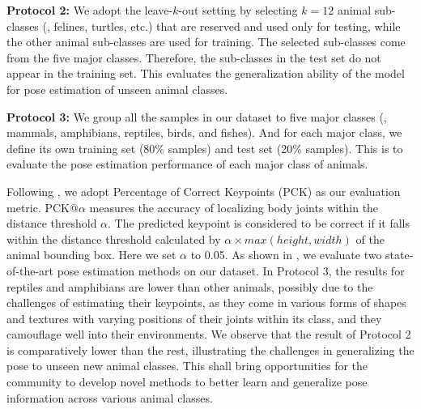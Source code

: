 \documentclass[10pt,twocolumn,letterpaper]{article}
\begin{document}
    \textbf{Protocol 2:} We adopt the leave-$k$-out setting by selecting $k=12$ animal sub-classes (\eg, felines, turtles, etc.) that are reserved and used only for testing, while the other animal sub-classes are used for training. The selected sub-classes come from the five major classes. Therefore, the sub-classes in the test set do not appear in the training set. This evaluates the generalization ability of the model for pose estimation of unseen animal classes.
    
    \textbf{Protocol 3:} We group all the samples in our dataset to five major classes (\ie, mammals, amphibians, reptiles, birds, and fishes). And for each major class, we define its own training set (80\% samples) and test set (20\% samples). This is to evaluate the pose estimation performance of each major class of animals. 
    
    Following \cite{yang2012articulated}, we adopt Percentage of Correct Keypoints (PCK) as our evaluation metric. PCK@$\alpha$ measures the accuracy of localizing body joints within the distance threshold $\alpha$. The predicted keypoint is considered to be correct if it falls within the distance threshold calculated by \begin{math} \alpha \times max(height, width) \end{math} of the animal bounding box. Here we set $\alpha$ to 0.05. As shown in , we evaluate two state-of-the-art pose estimation methods \cite{SunXLW19,Zhang_2020_CVPR} on our dataset.
    In Protocol 3, the results for reptiles and amphibians are lower than other animals, possibly due to the challenges of estimating their keypoints, as they come in various forms of shapes and textures with varying positions of their joints within its class, and they camouflage well into their environments. We observe that the result of Protocol 2 is comparatively lower than the rest, illustrating the challenges in generalizing the pose to unseen new animal classes. This shall bring opportunities for the community to develop novel methods to better learn and generalize pose information across various animal classes.
    
\end{document}
